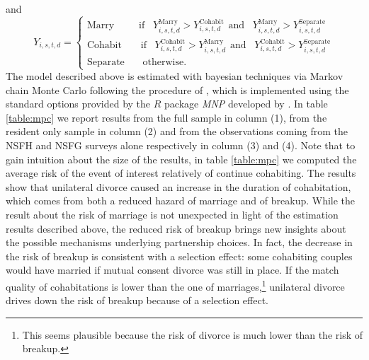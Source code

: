 \documentclass[12pt]{article}
\numberwithin{table}{section}
\begin{document}
and
\begin{equation}\label{eq:probit_outcome}
Y_{i,s,t,d}=
\begin{cases}  	
\text{Marry}\hspace{30pt}       \text{if}\hspace{10pt}Y_{i,s,t,d}^\text{Marry}>Y_{i,s,t,d}^\text{Cohabit}\hspace{5pt}\text{and}\hspace{5pt}\hspace{5pt}Y_{i,s,t,d}^\text{Marry}>Y_{i,s,t,d}^\text{Separate}\\
\text{Cohabit}\hspace{23pt}   \text{if}\hspace{10pt}Y_{i,s,t,d}^\text{Cohabit}>Y_{i,s,t,d}^\text{Marry}\hspace{5pt}\text{and}\hspace{5pt}\hspace{5pt}Y_{i,s,t,d}^\text{Cohabit}>Y_{i,s,t,d}^\text{Separate}\\
\text{Separate}\hspace{22pt}     \text{otherwise.}
\end{cases}
\end{equation}
The model described above is estimated with bayesian techniques via Markov chain Monte Carlo following the procedure of \cite{imai2005a}, which is implemented using the standard options provided by the $R$ package \textit{MNP} developed by \cite{imai2005b}. In table \ref{table:mpc} we report results from the full sample in column (1), from the resident only sample in column (2) and from the observations coming from the NSFH and NSFG surveys alone respectively in column (3) and (4). Note that to gain intuition about the size of the results, in  table \ref{table:mpc} we computed the average risk of the event of interest relatively of continue cohabiting. The results show that unilateral divorce caused an increase in the duration of cohabitation, which comes from both a reduced hazard of marriage and of breakup. While the result about the risk of marriage is not unexpected in light of the estimation results described above, the reduced risk of breakup brings new insights about the possible mechanisms underlying partnership choices. In fact, the decrease in the risk of breakup is consistent with a selection effect: some cohabiting couples would have married if mutual consent divorce was still in place. If the match quality of cohabitations is lower than the one of marriages,\footnote{This seems plausible because the risk of divorce is much lower than the risk of breakup.} unilateral divorce drives down the risk of breakup because of a selection effect. 
\end{document}
